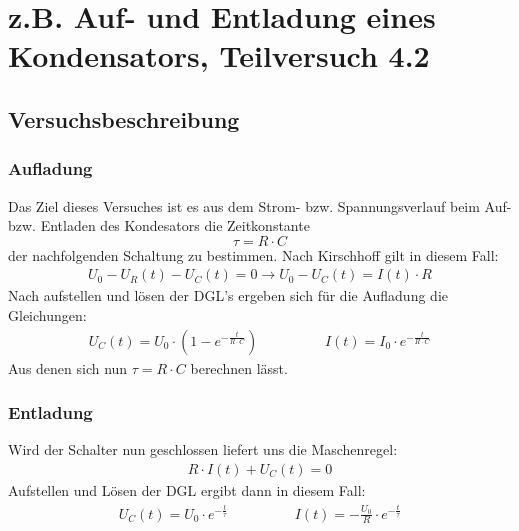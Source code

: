 \documentclass[12pt,a4paper]{article}
\author{Gruppe C14 \\ Julián Häck, Martin Koytek, Lars Wenning, Erik Zimmermann}
\begin{document}
\section{z.B. Auf- und Entladung eines Kondensators, Teilversuch 4.2}
\subsection{Versuchsbeschreibung}
\subsubsection*{Aufladung}
Das Ziel dieses Versuches ist es aus dem Strom- bzw. Spannungsverlauf beim Auf- bzw. Entladen des Kondesators die Zeitkonstante
\[\tau = R \cdot C \]
der nachfolgenden Schaltung zu bestimmen.
Nach Kirschhoff gilt in diesem Fall:
\begin{align*}
U_0-U_R(t)-U_C(t)=0 \rightarrow U_0-U_C(t)=I(t) \cdot R
\end{align*}
Nach aufstellen und lösen der DGL's ergeben sich für die Aufladung die Gleichungen:
\begin{align*}
U_C(t)=U_0 \cdot (1-e^{-\frac{t}{R \cdot C}}) \hspace{2cm} I(t)=I_0 \cdot e^{-\frac{t}{R \cdot C}}
\end{align*}
Aus denen sich nun $\tau=R \cdot C$ berechnen lässt.
\subsubsection*{Entladung}
Wird der Schalter nun geschlossen liefert uns die Maschenregel:
\begin{align*}
R \cdot I(t) + U_C(t) = 0
\end{align*}
Aufstellen und Lösen der DGL ergibt dann in diesem Fall:
\begin{align*}
U_C(t)=U_0 \cdot e^{-\frac{t}{\tau}} \hspace{2cm} I(t)=-\frac{U_0}{R} \cdot e^{-\frac{t}{\tau}}
\end{align*}
\end{document}
